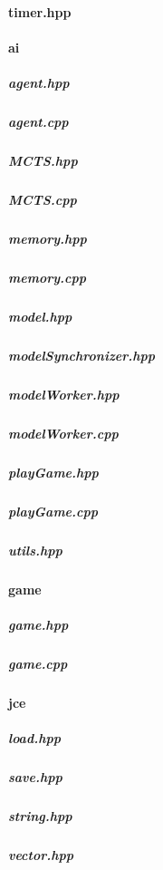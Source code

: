\documentclass[12pt]{article}
\newcommand{\incFile}[2]{\label{code:#2}}
\begin{document}
\paragraph{timer.hpp}													\incFile{C++}{AlphaZeroPytorch/include/timer.hpp}
\paragraph{ai}																	%
\subparagraph{agent.hpp}												\incFile{C++}{AlphaZeroPytorch/include/ai/agent.hpp} \label{code:Agent}
\subparagraph{agent.cpp}												\incFile{C++}{AlphaZeroPytorch/include/ai/agent.cpp}
\subparagraph{MCTS.hpp}												\incFile{C++}{AlphaZeroPytorch/include/ai/MCTS.hpp}
\subparagraph{MCTS.cpp}												\incFile{C++}{AlphaZeroPytorch/include/ai/MCTS.cpp}
\subparagraph{memory.hpp}											\incFile{C++}{AlphaZeroPytorch/include/ai/memory.hpp}
\subparagraph{memory.cpp}											\incFile{C++}{AlphaZeroPytorch/include/ai/memory.cpp}
\subparagraph{model.hpp}											\incFile{C++}{AlphaZeroPytorch/include/ai/model.hpp}
\subparagraph{modelSynchronizer.hpp}						\incFile{C++}{AlphaZeroPytorch/include/ai/modelSynchronizer.hpp}
\subparagraph{modelWorker.hpp}								\incFile{C++}{AlphaZeroPytorch/include/ai/modelWorker.hpp}
\subparagraph{modelWorker.cpp}									\incFile{C++}{AlphaZeroPytorch/include/ai/modelWorker.cpp}
\subparagraph{playGame.hpp}										\incFile{C++}{AlphaZeroPytorch/include/ai/playGame.hpp}\label{code:playGame}
\subparagraph{playGame.cpp}										\incFile{C++}{AlphaZeroPytorch/include/ai/playGame.cpp}
\subparagraph{utils.hpp}												\incFile{C++}{AlphaZeroPytorch/include/ai/utils.hpp}
\paragraph{game}															%
\subparagraph{game.hpp}												\incFile{C++}{AlphaZeroPytorch/include/game/game.hpp}\label{code:Game}
\subparagraph{game.cpp}												\incFile{C++}{AlphaZeroPytorch/include/game/game.cpp}
\paragraph{jce}																%
\subparagraph{load.hpp}												\incFile{C++}{AlphaZeroPytorch/include/jce/load.hpp}
\subparagraph{save.hpp}												\incFile{C++}{AlphaZeroPytorch/include/jce/save.hpp}
\subparagraph{string.hpp}												\incFile{C++}{AlphaZeroPytorch/include/jce/string.hpp}
\subparagraph{vector.hpp}											\incFile{C++}{AlphaZeroPytorch/include/jce/vector.hpp}
\end{document}
